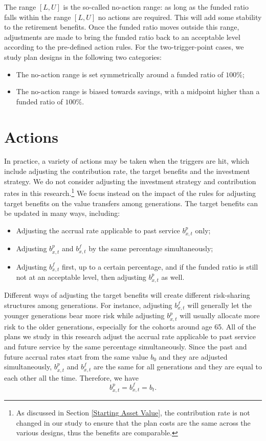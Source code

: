 \documentclass{sfuthesis}
\numberwithin{equation}{chapter}
\begin{document}
		\justify
		The range $\left[L, U \right]$ is the so-called no-action range: as long as the funded ratio falls within the range $[L, U]$ no actions are required. This will add some stability to the retirement benefits. Once the funded ratio moves outside this range, adjustments are made to bring the funded ratio back to an acceptable level according to the pre-defined action rules. For the two-trigger-point cases, we study plan designs in the following two categories:
		\begin{itemize}
			\item The no-action range is set symmetrically around a funded ratio of $100\%$;
			\item The no-action range is biased towards savings, with a midpoint higher than a funded ratio of $100\%$.
		\end{itemize}
	
	
	\section{Actions}
	\label{Actions}
	
		\justify
		In practice, a variety of actions may be taken when the triggers are hit, which include adjusting the contribution rate, the target benefits and the investment strategy. We do not consider adjusting the investment strategy and contribution rates in this research.\footnote{As discussed in Section \ref{Starting Asset Value}, the contribution rate is not changed in our study to ensure that the plan costs are the same across the various designs, thus the benefits are comparable.} We focus instead on the impact of the rules for adjusting target benefits on the value transfers among generations. The target benefits can be updated in many ways, including:
		\begin{itemize}
			\item Adjusting the accrual rate applicable to past service $b_{x,t}^p$ only;
			\item Adjusting $b_{x,t}^p$ and $b_{x,t}^f$ by the same percentage simultaneously;
			\item Adjusting $b_{x,t}^f$ first, up to a certain percentage, and if the funded ratio is still not at an acceptable level, then adjusting $b_{x,t}^p$ as well.
		\end{itemize}
	
	
		\justify
		Different ways of adjusting the target benefits will create different risk-sharing structures among generations. For instance, adjusting $b_{x,t}^f$ will generally let the younger generations bear more risk while adjusting $b_{x,t}^p$ will usually allocate more risk to the older generations, especially for the cohorts around age 65. All of the plans we study in this research adjust the accrual rate applicable to past service and future service by the same percentage simultaneously. Since the past and future accrual rates start from the same value $b_{0}$ and they are adjusted simultaneously, $b_{x,t}^p$ and $b_{x,t}^f$ are the same for all generations and they are equal to each other all the time. Therefore, we have
		\begin{equation}
		\label{eq:STBP_33}
		b_{x,t}^p = b_{x,t}^f = b_{t}.
		\end{equation}
		
\end{document}
